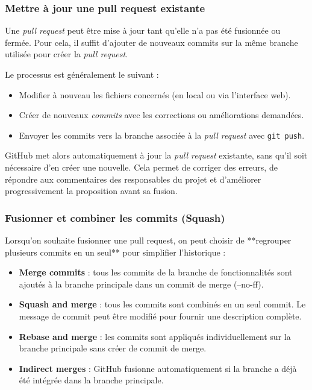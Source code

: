 \documentclass{article}
\begin{document}
\subsubsection{Mettre à jour une pull request existante}

Une \textit{pull request} peut être mise à jour tant qu’elle n’a pas été fusionnée ou fermée.
Pour cela, il suffit d’ajouter de nouveaux commits sur la même branche utilisée pour créer la \textit{pull request}.

Le processus est généralement le suivant :
\begin{itemize}
    \item Modifier à nouveau les fichiers concernés (en local ou via l’interface web).
    \item Créer de nouveaux \textit{commits} avec les corrections ou améliorations demandées.
    \item Envoyer les commits vers la branche associée à la \textit{pull request} avec \texttt{git push}.
\end{itemize}
GitHub met alors automatiquement à jour la \textit{pull request} existante, sans qu’il soit nécessaire d’en créer une nouvelle.
Cela permet de corriger des erreurs, de répondre aux commentaires des responsables du projet et d’améliorer progressivement la proposition avant sa fusion.

\subsubsection{Fusionner et combiner les commits (Squash)}

Lorsqu’on souhaite fusionner une pull request, on peut choisir de **regrouper plusieurs commits en un seul** pour simplifier l’historique :

\begin{itemize}
    \item \textbf{Merge commits} : tous les commits de la branche de fonctionnalités sont ajoutés à la branche principale dans un commit de merge (--no-ff).
    \item \textbf{Squash and merge} : tous les commits sont combinés en un seul commit. Le message de commit peut être modifié pour fournir une description complète.
    \item \textbf{Rebase and merge} : les commits sont appliqués individuellement sur la branche principale sans créer de commit de merge.
    \item \textbf{Indirect merges} : GitHub fusionne automatiquement si la branche a déjà été intégrée dans la branche principale.
\end{itemize}
\end{document}
